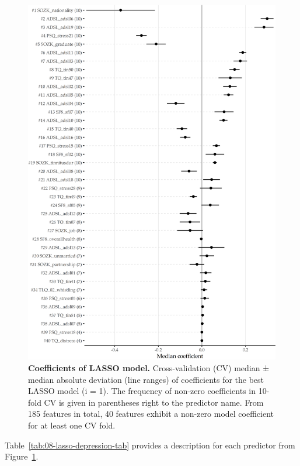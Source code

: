 \documentclass[
  oneside]{book}
\begin{document}
\begin{figure}[htb]

{\centering \includegraphics[width=1\linewidth]{figures/08-lasso-depression} 

}

\caption{\textbf{Coefficients of LASSO model.} Cross-validation (CV) median ± median absolute deviation (line ranges) of coefficients for the best LASSO model (i = 1). The frequency of non-zero coefficients in 10-fold CV is given in parentheses right to the predictor name. From 185 features in total, 40 features exhibit a non-zero model coefficient for at least one CV fold.}\label{fig:08-lasso-depression}
\end{figure}

Table~\ref{tab:08-lasso-depression-tab} provides a description for each predictor from Figure~\ref{fig:08-lasso-depression}.
\end{document}
